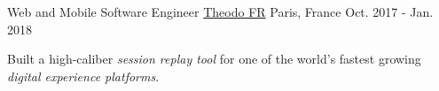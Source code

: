 \begin{cventries}
  \cventry
    {Web and Mobile Software Engineer} %
    {\href{https://www.theodo.fr/}{Theodo FR}} %
    {Paris, France} %
    {Oct. 2017 - Jan. 2018} %
    {
      \begin{cvitems} %
        \item Built a high-caliber \textit{session replay tool} for one of the world's fastest growing \textit{digital experience platforms}.
      \end{cvitems}
    }
    {}


\end{cventries}
